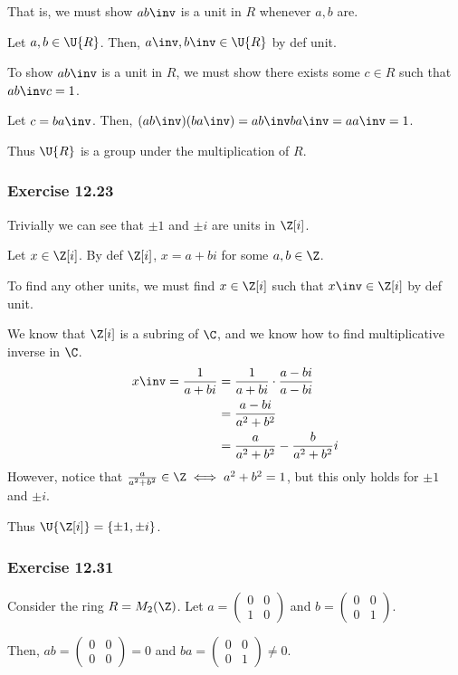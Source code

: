 \documentclass{article}
\begin{document}
That is, we must show \( ab\inv \) is a unit in \( R \) whenever \( a,b \) are.

Let \( a,b \in \U{R} \). Then, \( a\inv, b\inv \in \U{R} \) by def unit.

To show \( ab\inv \) is a unit in \( R \), we must show there exists some \( c \in R \) such that \( ab\inv c = 1 \).

Let \( c = ba\inv \). Then, \( (ab\inv)(ba\inv) = ab\inv ba\inv = aa\inv = 1 \).

Thus \( \U{R} \) is a group under the multiplication of \( R \).

\subsubsection*{Exercise 12.23}
Trivially we can see that \( \pm 1 \) and \( \pm i \) are units in \( \Z[i]\).

Let \( x \in \Z[i] \). By def \( \Z[i] \), \( x=a+bi \) for some \( a,b\in\Z \).

To find any other units, we must find \( x \in \Z[i] \) such that \( x\inv \in \Z[i]\) by def unit.

We know that \( \Z[i] \) is a subring of \( \C \), and we know how to find multiplicative inverse in \( \C \).
\begin{align*}
  x\inv = \frac{1}{a+bi} &= \frac{1}{a+bi}\cdot \frac{a-bi}{a-bi} \\
  &= \frac{a-bi}{a^2+b^2} \\
  &= \frac{a}{a^2+b^2} - \frac{b}{a^2+b^2}i
\end{align*}
However, notice that \( \frac{a}{a^2+b^2} \in \Z \iff a^2+b^2 = 1 \), but this only holds for \( \pm 1 \) and \( \pm i \).

Thus \( \U{\Z[i]} = \{\pm 1, \pm i\} \).

\subsubsection*{Exercise 12.31}
Consider the ring \( R = M_2(\Z) \). Let \( a = \begin{pmatrix}
  0 & 0 \\ 1 & 0
\end{pmatrix} \) and \( b = \begin{pmatrix}
  0 & 0 \\ 0 & 1
\end{pmatrix} \).

Then, \( ab = \begin{pmatrix}
  0 & 0 \\ 0 & 0
\end{pmatrix} = 0 \) and \( ba = \begin{pmatrix}
  0 & 0 \\ 0 & 1
\end{pmatrix} \neq 0\).
\end{document}
